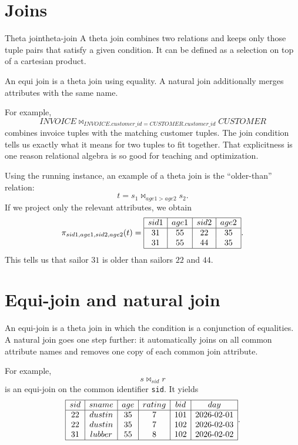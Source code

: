 \documentclass[11pt,a4paper,openany]{book}
\newcommand{\RAproject}{\pi}
\newcommand{\join}{\bowtie}
\begin{document}
\section{Joins}
\begin{definition}{Theta join}{theta-join}
A theta join combines two relations and keeps only those tuple pairs that satisfy a given condition. It can be defined as a selection on top of a cartesian product.
\end{definition}

An equi join is a theta join using equality. A natural join additionally merges attributes with the same name.

For example,
\[
INVOICE \join_{INVOICE.customer\_id = CUSTOMER.customer\_id} CUSTOMER
\]
combines invoice tuples with the matching customer tuples. The join condition tells us exactly what it means for two tuples to fit together. That explicitness is one reason relational algebra is so good for teaching and optimization.

Using the running instance, an example of a theta join is the ``older-than'' relation:
\[
t=s_1\join_{age1>age2}s_2.
\]
If we project only the relevant attributes, we obtain
\[
\RAproject_{sid1,age1,sid2,age2}(t)=
\begin{array}{|c|c|c|c|}\hline
sid1&age1&sid2&age2\\\hline
31&55&22&35\\
31&55&44&35\\\hline
\end{array}.
\]
This tells us that sailor \(31\) is older than sailors \(22\) and \(44\).

\section{Equi-join and natural join}
An equi-join is a theta join in which the condition is a conjunction of equalities. A natural join goes one step further: it automatically joins on all common attribute names and removes one copy of each common join attribute.

For example,
\[
s \join_{sid} r
\]
is an equi-join on the common identifier \texttt{sid}. It yields
\[
\begin{array}{|c|c|c|c|c|c|}\hline
sid&sname&age&rating&bid&day\\\hline
22&dustin&35&7&101&2026\text{-}02\text{-}01\\
22&dustin&35&7&102&2026\text{-}02\text{-}03\\
31&lubber&55&8&102&2026\text{-}02\text{-}02\\\hline
\end{array}.
\]
\end{document}

